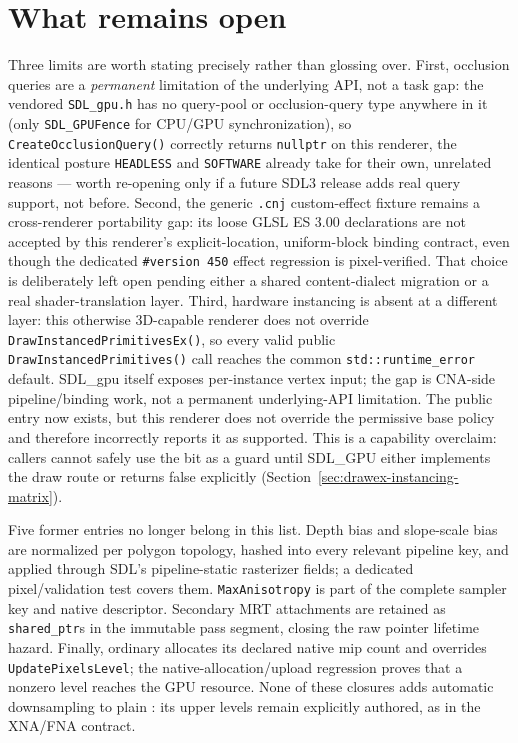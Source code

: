 \section{What remains open}
\label{sec:sdlgpu-what-remains-open}

Three limits are worth stating precisely rather than glossing over. First, occlusion queries are a
\emph{permanent} limitation of the underlying API, not a task gap: the vendored
\texttt{SDL\_gpu.h} has no query-pool or occlusion-query type anywhere in it (only
\texttt{SDL\_GPUFence} for CPU/GPU synchronization), so \texttt{CreateOcclusionQuery()}
correctly returns \texttt{nullptr} on this renderer, the identical posture \texttt{HEADLESS} and
\texttt{SOFTWARE} already take for their own, unrelated reasons --- worth re-opening only if a
future SDL3 release adds real query support, not before. Second, the generic \texttt{.cnj} custom-effect fixture remains a
cross-renderer portability gap: its loose GLSL ES 3.00 declarations are not accepted by this
renderer's explicit-location, uniform-block binding contract, even though the dedicated
\texttt{\#version 450} effect regression is pixel-verified. That choice is deliberately left
open pending either a shared content-dialect migration or a real shader-translation layer.
Third, hardware instancing is absent at a different layer: this otherwise 3D-capable renderer
does not override \texttt{DrawInstancedPrimitivesEx()}, so every valid public
\texttt{DrawInstancedPrimitives()} call reaches the common
\texttt{std::runtime\_error} default. SDL\_gpu itself exposes per-instance vertex input; the
gap is CNA-side pipeline/binding work, not a permanent underlying-API limitation. The public
 entry now exists, but this renderer does not override
the permissive base policy and therefore incorrectly reports it as supported. This is a
capability overclaim: callers cannot safely use the bit as a guard until SDL\_GPU either
implements the draw route or returns false explicitly
(Section~\ref{sec:drawex-instancing-matrix}).

Five former entries no longer belong in this list. Depth bias and slope-scale bias are
normalized per polygon topology, hashed into every relevant pipeline key, and applied through
SDL's pipeline-static rasterizer fields; a dedicated pixel/validation test covers them.
\texttt{MaxAnisotropy} is part of the complete sampler key and native descriptor. Secondary MRT
attachments are retained as \texttt{shared\_ptr}s in the immutable pass segment, closing the raw
pointer lifetime hazard. Finally, ordinary  allocates its declared native
mip count and overrides \texttt{UpdatePixelsLevel}; the native-allocation/upload regression
proves that a nonzero level reaches the GPU resource. None of these closures adds automatic
downsampling to plain : its upper levels remain explicitly authored, as in
the XNA/FNA contract.

